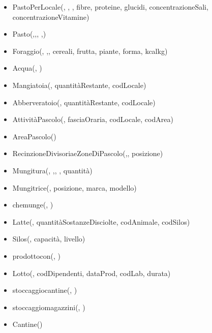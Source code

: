 \documentclass[12pt,a4paper]{article}
\begin{document}
\begin{itemize}
\item PastoPerLocale(\underline{}, \underline{},  \underline{},  fibre,  proteine,  glucidi,  concentrazioneSali,  concentrazioneVitamine)
\item Pasto(\underline{},\underline{},\underline{}, \underline{},\underline{})
\item Foraggio(\underline{}, \underline{},\underline{}, cereali, frutta, piante, forma, kcalkg)
\item Acqua(\underline{}, \underline{})
\item Mangiatoia(\underline{}, quantitàRestante,  codLocale)
\item Abberveratoio(\underline{}, quantitàRestante,  codLocale)
\item AttivitàPascolo(\underline{}, fasciaOraria,  codLocale,  codArea)
\item AreaPascolo(\underline{})
\item RecinzioneDivisoriaeZoneDiPascolo(\underline{},\underline{}, posizione)
\item Mungitura(\underline{}, \underline{},\underline{}, \underline{}, quantità)
\item Mungitrice(\underline{}, posizione, marca, modello)
\item chemunge(\underline{}, \underline{})
\item Latte(\underline{}, quantitàSostanzeDisciolte,  codAnimale,  codSilos)
\item Silos(\underline{}, capacità, livello)
\item prodottocon(\underline{}, \underline{})
\item Lotto(\underline{}, codDipendenti, dataProd, codLab, durata)
\item stoccaggiocantine(\underline{}, \underline{})
\item stoccaggiomagazzini(\underline{}, \underline{})
\item Cantine(\underline{})

\end{itemize}
\end{document}
